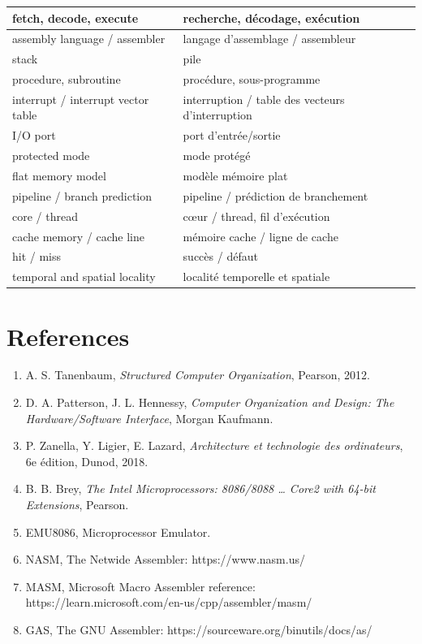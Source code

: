\begin{center}
\begin{tabular}{|l|l|}
    fetch, decode, execute & recherche, décodage, exécution \\ \hline
    assembly language / assembler & langage d'assemblage / assembleur \\ \hline
    stack & pile \\ \hline
    procedure, subroutine & procédure, sous-programme \\ \hline
    interrupt / interrupt vector table & interruption / table des vecteurs d'interruption \\ \hline
    I/O port & port d'entrée/sortie \\ \hline
    protected mode & mode protégé \\ \hline
    flat memory model & modèle mémoire plat \\ \hline
    pipeline / branch prediction & pipeline / prédiction de branchement \\ \hline
    core / thread & cœur / thread, fil d'exécution \\ \hline
    cache memory / cache line & mémoire cache / ligne de cache \\ \hline
    hit / miss & succès / défaut \\ \hline
    temporal and spatial locality & localité temporelle et spatiale \\ \hline
\end{tabular}
\end{center}

\section*{References}
\begin{enumerate}
    \item A. S. Tanenbaum, \emph{Structured Computer Organization}, Pearson, 2012.
    \item D. A. Patterson, J. L. Hennessy, \emph{Computer Organization and Design: The Hardware/Software Interface}, Morgan Kaufmann.
    \item P. Zanella, Y. Ligier, E. Lazard, \emph{Architecture et technologie des ordinateurs}, 6e édition, Dunod, 2018.
    \item B. B. Brey, \emph{The Intel Microprocessors: 8086/8088 \dots{} Core2 with 64-bit Extensions}, Pearson.
    \item EMU8086, Microprocessor Emulator.
    \item NASM, The Netwide Assembler: https://www.nasm.us/
    \item MASM, Microsoft Macro Assembler reference: \\ {\small https://learn.microsoft.com/en-us/cpp/assembler/masm/}
    \item GAS, The GNU Assembler: https://sourceware.org/binutils/docs/as/
\end{enumerate}
